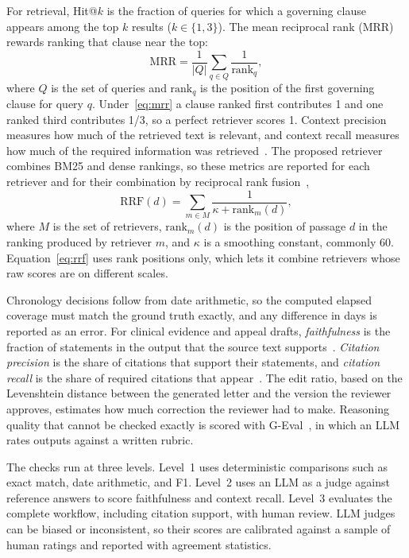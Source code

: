 \documentclass[conference]{IEEEtran}
\begin{document}
For retrieval, Hit@$k$ is the fraction of queries for which a governing clause appears among the top $k$ results ($k \in \{1,3\}$). The mean reciprocal rank (MRR) rewards ranking that clause near the top:
\begin{equation}
\text{MRR} = \frac{1}{|Q|}\sum_{q \in Q}\frac{1}{\text{rank}_q},
\label{eq:mrr}
\end{equation}
where $Q$ is the set of queries and $\text{rank}_q$ is the position of the first governing clause for query $q$. Under~\eqref{eq:mrr} a clause ranked first contributes 1 and one ranked third contributes 1/3, so a perfect retriever scores 1. Context precision measures how much of the retrieved text is relevant, and context recall measures how much of the required information was retrieved~\cite{es2024}. The proposed retriever combines BM25 and dense rankings, so these metrics are reported for each retriever and for their combination by reciprocal rank fusion~\cite{cormack2009},
\begin{equation}
\text{RRF}(d) = \sum_{m \in M}\frac{1}{\kappa + \text{rank}_m(d)},
\label{eq:rrf}
\end{equation}
where $M$ is the set of retrievers, $\text{rank}_m(d)$ is the position of passage $d$ in the ranking produced by retriever $m$, and $\kappa$ is a smoothing constant, commonly 60. Equation~\eqref{eq:rrf} uses rank positions only, which lets it combine retrievers whose raw scores are on different scales.

Chronology decisions follow from date arithmetic, so the computed elapsed coverage must match the ground truth exactly, and any difference in days is reported as an error. For clinical evidence and appeal drafts, \emph{faithfulness} is the fraction of statements in the output that the source text supports~\cite{es2024}. \emph{Citation precision} is the share of citations that support their statements, and \emph{citation recall} is the share of required citations that appear~\cite{gao2023}. The edit ratio, based on the Levenshtein distance between the generated letter and the version the reviewer approves, estimates how much correction the reviewer had to make. Reasoning quality that cannot be checked exactly is scored with G-Eval~\cite{liu2023}, in which an LLM rates outputs against a written rubric.

The checks run at three levels. Level~1 uses deterministic comparisons such as exact match, date arithmetic, and F1. Level~2 uses an LLM as a judge against reference answers to score faithfulness and context recall. Level~3 evaluates the complete workflow, including citation support, with human review. LLM judges can be biased or inconsistent, so their scores are calibrated against a sample of human ratings and reported with agreement statistics.
\end{document}
